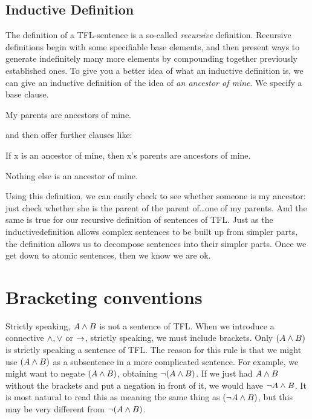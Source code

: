\subsection{Inductive Definition}
The definition of a TFL-sentence is a so-called \emph{recursive} definition. Recursive definitions begin with some specifiable base elements, and then present ways to generate indefinitely many more elements by compounding together previously established ones. To give you a better idea of what an inductive definition is, we can give an inductive definition of the idea of \emph{an ancestor of mine}. We specify a base clause.
	\begin{ebullet}
		\item My parents are ancestors of mine.
	\end{ebullet}
and then offer further clauses like:
	\begin{ebullet}
		\item If x is an ancestor of mine, then x's parents are ancestors of mine.
		\item Nothing else is an ancestor of mine.
	\end{ebullet}
Using this definition, we can easily check to see whether someone is my ancestor: just check whether she is the parent of the parent of\ldots one of my parents. And the same is true for our recursive definition of sentences of TFL. Just as the inductivedefinition allows complex sentences to be built up from simpler parts, the definition allows us to decompose sentences into their simpler parts. Once we get down to atomic sentences, then we know we are ok.

\section{Bracketing conventions}
\label{TFLconventions}


Strictly speaking, $A\mathbin{\wedge} B$ is not a sentence of TFL. When we introduce a connective $\mathbin{\wedge},\vee$ or $\rightarrow$, strictly speaking, we must include brackets. Only $(A\mathbin{\wedge} B)$ is strictly speaking a sentence of TFL. The reason for this rule is that we might use $(A\mathbin{\wedge} B)$ as a subsentence in a more complicated sentence. For example, we might want to negate $(A\mathbin{\wedge} B)$, obtaining $\neg(A\mathbin{\wedge} B)$. If we just had $A \mathbin{\wedge} B$ without the brackets and put a negation in front of it, we would have $\neg A \mathbin{\wedge} B$. It is most natural to read this as meaning the same thing as $(\neg A \mathbin{\wedge} B)$, but this may be very different from $\neg(A\mathbin{\wedge} B)$.

